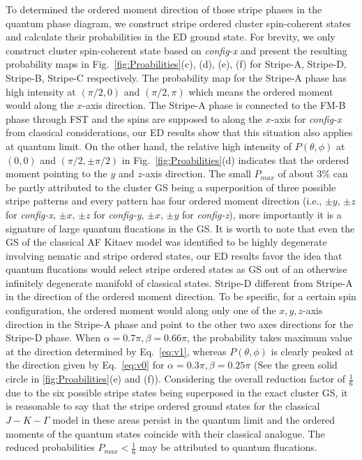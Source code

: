 \documentclass[aps,prb,reprint,amsfonts,amsmath,amssymb,showpacs,groupedaddress,superscriptaddress]{revtex4-1}
\begin{document}
To determined the ordered moment direction of those stripe phases in the quantum phase diagram, we construct stripe ordered cluster spin-coherent states and calculate their probabilities in the ED ground state. For brevity, we only construct cluster spin-coherent state based on \emph{config-x} and present the resulting probability maps in Fig.~\ref{fig:Proabilities}(c), (d), (e), (f) for Stripe-A, Stripe-D, Stripe-B, Stripe-C respectively. The probability map for the Stripe-A phase has high intensity at $(\pi/2, 0)$ and $(\pi/2, \pi)$ which means the ordered moment would along the $x$-axis direction. The Stripe-A phase is connected to the FM-B phase through FST and the spins are supposed to along the $x$-axis for \emph{config-x} from classical considerations, our ED results show that this situation also applies at quantum limit. On the other hand, the relative high intensity of $P(\theta, \phi)$ at $(0, 0)$ and $(\pi/2, \pm\pi/2)$ in Fig.~\ref{fig:Proabilities}(d) indicates that the ordered moment pointing to the $y$ and $z$-axis direction. The small $P_{max}$ of about 3\% can be partly attributed to the cluster GS being a superposition of three possible stripe patterns and every pattern has four ordered moment direction (i.e., $\pm y$, $\pm z$ for \emph{config-x}, $\pm x$, $\pm z$ for \emph{config-y}, $\pm x$, $\pm y$ for \emph{config-z}), more importantly it is a signature of large quantum flucations in the GS. It is worth to note that even the GS of the classical AF Kitaev model was identified to be highly degenerate involving nematic and stripe ordered states, our ED results favor the idea that quantum flucations would select stripe ordered states as GS out of an otherwise infinitely degenerate manifold of classical states. Stripe-D different from Stripe-A in the direction of the ordered moment direction. To be specific, for a certain spin configuration, the ordered moment would along only one of the $x, y, z$-axis direction in the Stripe-A phase and point to the other two axes directions for the Stripe-D phase. When $\alpha=0.7\pi,\beta=0.66\pi$, the probability takes maximum value at the direction determined by Eq.~\eqref{eq:v1}, whereas $P(\theta, \phi)$ is clearly peaked at the direction given by Eq.~\eqref{eq:v0} for $\alpha=0.3\pi, \beta=0.25\pi$ (See the green solid circle in \ref{fig:Proabilities}(e) and (f)). Considering the overall reduction factor of $\frac{1}{6}$ due to the six possible stripe states being superposed in the exact cluster GS, it is reasonable to say that the stripe ordered ground states for the classical $J-K-\Gamma$ model in these areas persist in the quantum limit and the ordered moments of the quantum states coincide with their classical analogue. The reduced probabilities $P_{max} < \frac{1}{6}$ may be attributed to quantum flucations.
\end{document}
